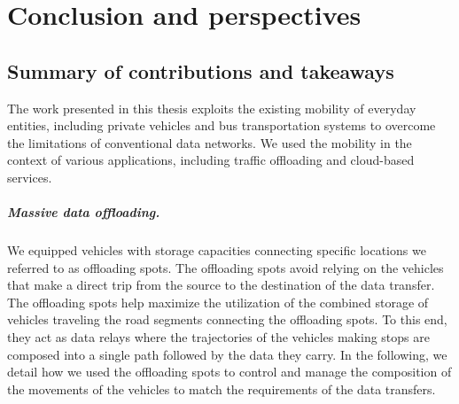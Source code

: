 \chapter{Conclusion and perspectives}
\label{cha:conclusion}

\section{Summary of contributions and takeaways}

The work presented in this thesis exploits the existing mobility of everyday entities, including private vehicles and bus transportation systems to overcome the limitations of conventional data networks. We used the mobility in the context of various applications, including traffic offloading and cloud-based services. 

\paragraph{Massive data offloading.} 
We equipped vehicles with storage capacities connecting specific locations we referred to as offloading spots. The offloading spots avoid relying on the vehicles that make a direct trip from the source to the destination of the data transfer. The offloading spots help maximize the utilization of the combined storage of vehicles traveling the road segments connecting the offloading spots. To this end, they act as data relays where the trajectories of the vehicles making stops are composed into a single path followed by the data they carry.  
In the following, we detail how we used the offloading spots to control and manage the composition of the movements of the vehicles to match the requirements of the data transfers.

